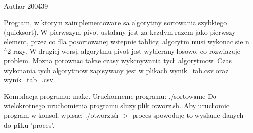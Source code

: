 \begin{DoxyAuthor}{\-Author}
200439
\end{DoxyAuthor}
\-Program, w ktorym zaimplementowane sa algorytmy sortowania szybkiego (quicksort). \-W pierwszym pivot ustalany jest za kazdym razem jako pierwszy element, przez co dla posortowanej wstepnie tablicy, algorytm musi wykonac sie n$^\wedge$2 razy. \-W drugiej wersji algorytmu pivot jest wybierany losowo, co rozwiazuje problem. \-Mozna porownac takze czasy wykonywania tych algorytmow. \-Czas wykonania tych algorytmow zapisywany jest w plikach wynik\-\_\-tab.\-csv oraz wynik\-\_\-tab\-\_.\-csv.

\-Kompilacja programu\-: make. \-Uruchomienie programu\-: ./sortowanie \-Do wielokrotnego uruchomienia programu sluzy plik otworz.\-sh. \-Aby uruchomic program w konsoli wpisac\-: ./otworz.sh $>$ proces spowoduje to wyslanie danych do pliku 'proces'. 